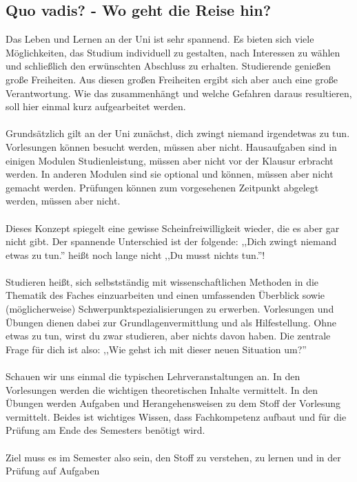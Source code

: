 \subsection{Quo vadis? - Wo geht die Reise hin?}
        Das Leben und Lernen an der Uni ist sehr spannend. Es bieten
	sich viele Möglichkeiten, das Studium individuell zu gestalten,
	nach Interessen zu wählen und schließlich den erwünschten
	Abschluss zu erhalten. Studierende genießen große Freiheiten. Aus diesen großen Freiheiten ergibt sich aber auch
	eine große Verantwortung. Wie das zusammenhängt und welche
	Gefahren daraus resultieren, soll hier einmal kurz aufgearbeitet
	werden. \\ \\
        Grundsätzlich gilt an der Uni zunächst, dich zwingt niemand irgendetwas zu tun. Vorlesungen können besucht werden, müssen aber nicht.
Hausaufgaben sind in einigen Modulen Studienleistung, müssen aber nicht vor der Klausur erbracht werden. In anderen Modulen sind sie optional und können, müssen aber nicht gemacht werden. 
Prüfungen können zum vorgesehenen Zeitpunkt abgelegt werden, müssen aber
nicht. \\\\
        Dieses Konzept spiegelt eine gewisse Scheinfreiwilligkeit
	wieder, die es aber gar nicht gibt. Der spannende Unterschied ist
	der folgende: ,,Dich zwingt niemand etwas zu tun.'' heißt noch
	lange nicht ,,Du musst nichts tun.''! \\\\
Studieren heißt, sich selbstständig mit wissenschaftlichen Methoden in
die Thematik des Faches einzuarbeiten und einen umfassenden Überblick
sowie (möglicherweise) Schwerpunktspezialisierungen zu erwerben.
Vorlesungen und Übungen dienen dabei zur Grundlagenvermittlung und als
Hilfestellung. Ohne etwas zu tun, wirst du zwar studieren, aber nichts
davon haben. Die zentrale Frage für dich ist also: ,,Wie gehst ich  mit
dieser neuen Situation um?''\\\\
 Schauen wir uns einmal die typischen Lehrveranstaltungen an. 
 In den Vorlesungen werden die wichtigen theoretischen Inhalte vermittelt. 
 In den Übungen werden Aufgaben und Herangehensweisen zu dem Stoff der Vorlesung vermittelt. 
 Beides ist wichtiges Wissen, dass Fachkompetenz aufbaut und für die
 Prüfung am Ende des Semesters benötigt wird.\\\\
Ziel muss es im Semester also sein, den Stoff zu verstehen, zu lernen und in der Prüfung auf Aufgaben 
